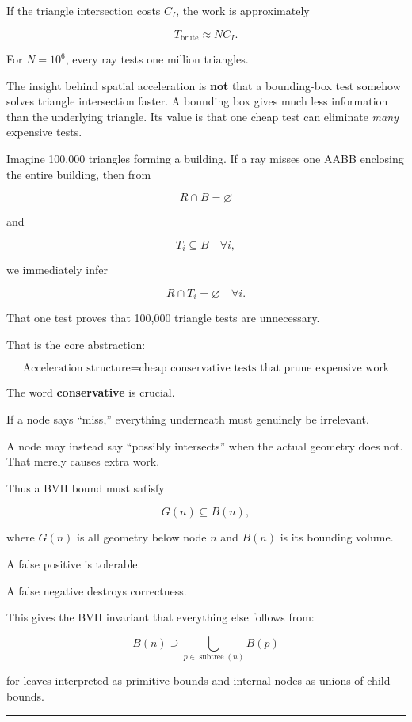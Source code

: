 If the triangle intersection costs \(C_I\), the work is approximately

\[
T_{\text{brute}}
\approx N C_I.
\]

For \(N=10^6\), every ray tests one million triangles.

The insight behind spatial acceleration is \textbf{not} that a bounding-box test somehow solves triangle intersection faster. A bounding box gives much less information than the underlying triangle. Its value is that one cheap test can eliminate \emph{many} expensive tests.

Imagine 100,000 triangles forming a building. If a ray misses one AABB enclosing the entire building, then from

\[
R\cap B=\varnothing
\]

and

\[
T_i\subseteq B\quad \forall i,
\]

we immediately infer

\[
R\cap T_i=\varnothing\quad \forall i.
\]

That one test proves that 100,000 triangle tests are unnecessary.

That is the core abstraction:

\[
\boxed{\text{Acceleration structure}=
\text{cheap conservative tests that prune expensive work}}
\]

The word \textbf{conservative} is crucial.

If a node says ``miss,'' everything underneath must genuinely be irrelevant.

A node may instead say ``possibly intersects'' when the actual geometry does not. That merely causes extra work.

Thus a BVH bound must satisfy

\[
G(n)\subseteq B(n),
\]

where \(G(n)\) is all geometry below node \(n\) and \(B(n)\) is its bounding volume.

A false positive is tolerable.

A false negative destroys correctness.

This gives the BVH invariant that everything else follows from:

\[
\boxed{
B(n)\supseteq
\bigcup_{p\in\operatorname{subtree}(n)} B(p)
}
\]

for leaves interpreted as primitive bounds and internal nodes as unions of child bounds.

\begin{center}\rule{0.5\linewidth}{0.5pt}\end{center}

